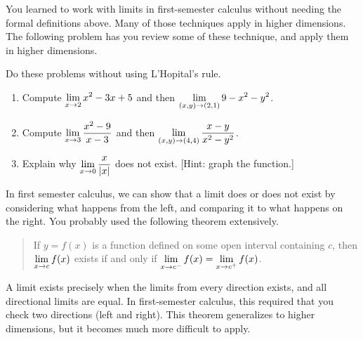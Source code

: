 You learned to work with limits in first-semester calculus without needing the formal definitions above. Many of those techniques apply in higher dimensions. 
The following problem has you review some of these technique, and apply them in higher dimensions.
\begin{problem}%
 Do these problems without using L'Hopital's rule.
\begin{enumerate}
 \item Compute $\displaystyle \lim_{x\to 2} x^2-3x+5$ and then $\displaystyle\lim_{(x,y)\to (2,1)} 9-x^2-y^2$.
 \item Compute $\displaystyle\lim_{x\to 3}\frac{x^2-9}{x-3}$ and then $\displaystyle\lim_{(x,y)\to (4,4)} \frac{x-y}{x^2-y^2}$.
 \item Explain why $\displaystyle\lim_{x\to 0}\frac{x}{|x|}$ does not exist. [Hint: graph the function.]
\end{enumerate}
\end{problem}



In first semester calculus, we can show that a limit does or does not exist by considering what happens from the left, and comparing it to what happens on the right.  You probably used the following theorem extensively. 
\begin{quote}
 If $y=f(x)$ is a function defined on some open interval containing $c$, then $\displaystyle\lim_{x\to c}f(x)$ exists if and only if  $\displaystyle\lim_{x\to c^-}f(x) = \displaystyle\lim_{x\to c^+}f(x)$.
\end{quote}
 A limit exists precisely when the limits from every direction exists, and all directional limits are equal. In first-semester calculus, this required that you check two directions (left and right). This theorem generalizes to higher dimensions, but it becomes much more difficult to apply. 

